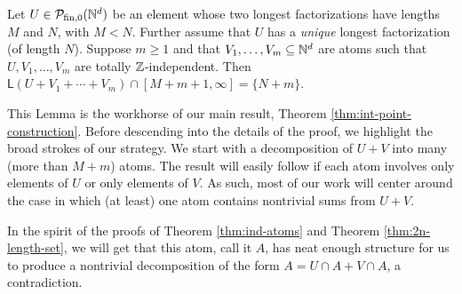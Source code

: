 \begin{lemma} \label{lem:unique longest factorization}
	Let $U\in \mathcal{P}_{\textrm{fin}, 0}(\mathbb{N}^d)$ be an element whose two longest factorizations have lengths $M$ and $N$, with $M < N$.
	Further assume that $U$ has a \textit{unique} longest factorization (of length $N$).
	Suppose $m\ge1$ and that $V_1,\dots,V_m\subseteq \mathbb{N}^d$ are atoms such that $U,V_1,\dots, V_m$ are totally $\mathbb{Z}$-independent.
	Then $\mathsf{L}(U+V_1+\cdots+V_m) \cap [ M+m+1,\infty ] = \{N+m\}$.
\end{lemma}

This Lemma is the workhorse of our main result, Theorem \ref{thm:int-point-construction}. 
Before descending into the details of the proof, we highlight the broad strokes of our strategy.
We start with a decomposition of $U+V$ into many (more than $M+m$) atoms.
The result will easily follow if each atom involves only elements of $U$ or only elements of $V$.
As such, most of our work will center around the case in which (at least) one atom contains nontrivial sums from $U+V$.

In the spirit of the proofs of Theorem \ref{thm:ind-atoms} and Theorem \ref{thm:2n-length-set}, we will get that this atom, call it $A$, has neat enough structure for us to produce a nontrivial decomposition of the form $A = U\cap A + V\cap A$, a contradiction.


